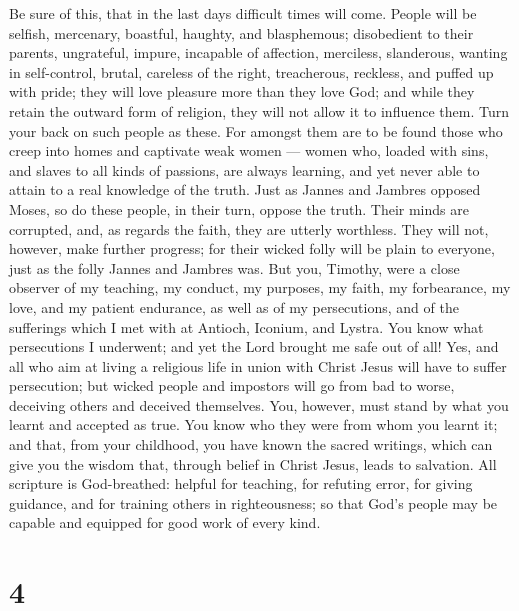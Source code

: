  Be sure of this, that in the last days difficult times will
come.  People will be selfish, mercenary, boastful, haughty,
and blasphemous; disobedient to their parents, ungrateful, impure,
 incapable of affection, merciless, slanderous, wanting in
self-control, brutal, careless of the right,  treacherous,
reckless, and puffed up with pride; they will love pleasure more than
they love God;  and while they retain the outward form of
religion, they will not allow it to influence them. Turn your back on
such people as these.  For amongst them are to be found
those who creep into homes and captivate weak women --- women who,
loaded with sins, and slaves to all kinds of passions,  are
always learning, and yet never able to attain to a real knowledge of the
truth.  Just as Jannes and Jambres opposed Moses, so do
these people, in their turn, oppose the truth. Their minds are
corrupted, and, as regards the faith, they are utterly worthless.
 They will not, however, make further progress; for their
wicked folly will be plain to everyone, just as the folly Jannes and
Jambres was.  But you, Timothy, were a close observer of my
teaching, my conduct, my purposes, my faith, my forbearance, my love,
and my patient endurance,  as well as of my persecutions,
and of the sufferings which I met with at Antioch, Iconium, and Lystra.
You know what persecutions I underwent; and yet the Lord brought me safe
out of all!  Yes, and all who aim at living a religious
life in union with Christ Jesus will have to suffer persecution;
 but wicked people and impostors will go from bad to worse,
deceiving others and deceived themselves.  You, however,
must stand by what you learnt and accepted as true. You know who they
were from whom you learnt it;  and that, from your
childhood, you have known the sacred writings, which can give you the
wisdom that, through belief in Christ Jesus, leads to salvation.
 All scripture is God-breathed: helpful for teaching, for
refuting error, for giving guidance, and for training others in
righteousness;  so that God's people may be capable and
equipped for good work of every kind.

\hypertarget{section-3}{%
\section{4}\label{section-3}}

